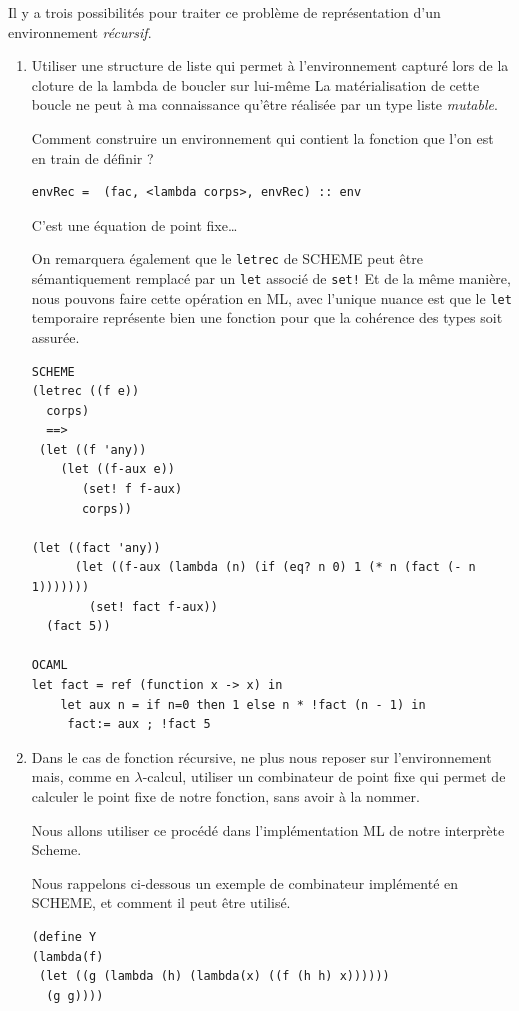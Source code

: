 Il y a trois possibilités pour traiter ce problème de représentation d'un environnement \textit{récursif}.
\begin{enumerate}
  \item Utiliser une structure de liste qui permet à l'environnement capturé lors de la cloture de la lambda de boucler sur lui-même
La matérialisation de cette boucle ne peut à ma connaissance qu'être réalisée par un type liste \textit{mutable}.

Comment construire un environnement qui contient la fonction que l'on est en train de définir ?
\begin{verbatim}
envRec =  (fac, <lambda corps>, envRec) :: env 
\end{verbatim}

C'est une équation de point fixe\ldots

On remarquera également que le \texttt{letrec} de SCHEME peut être sémantiquement remplacé par un \texttt{let} associé de \texttt{set!}
Et de la même manière, nous pouvons faire cette opération en ML, avec l'unique nuance est que le \verb+let+ temporaire représente bien
une fonction pour que la cohérence des types soit assurée.

\begin{verbatim}
SCHEME
(letrec ((f e))
  corps)
  ==>
 (let ((f 'any))
    (let ((f-aux e))
       (set! f f-aux)
       corps))

(let ((fact 'any))
      (let ((f-aux (lambda (n) (if (eq? n 0) 1 (* n (fact (- n 1)))))))
        (set! fact f-aux))
  (fact 5))

OCAML 
let fact = ref (function x -> x) in
	let aux n = if n=0 then 1 else n * !fact (n - 1) in
	 fact:= aux ; !fact 5
\end{verbatim}

  \item Dans le cas de fonction récursive, ne plus nous reposer sur l'environnement mais, comme en $\lambda$-calcul, 
  utiliser un combinateur de point fixe qui  permet de calculer le point fixe de notre fonction, sans avoir à la nommer.

  Nous allons utiliser ce procédé dans l'implémentation ML de notre interprète Scheme.

  Nous rappelons ci-dessous un exemple de  combinateur implémenté en SCHEME, et comment il peut être utilisé.

\begin{verbatim}
(define Y
(lambda(f)
 (let ((g (lambda (h) (lambda(x) ((f (h h) x))))))
  (g g))))


\end{verbatim}
\end{enumerate}
